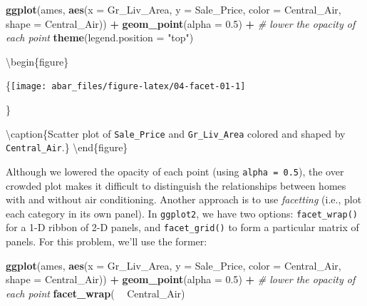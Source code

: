 \documentclass[]{book}
\newenvironment{Shaded}{\begin{snugshade}}{\end{snugshade}}
\newcommand{\CommentTok}[1]{\textcolor[rgb]{0.56,0.35,0.01}{\textit{#1}}}
\newcommand{\DataTypeTok}[1]{\textcolor[rgb]{0.13,0.29,0.53}{#1}}
\newcommand{\FloatTok}[1]{\textcolor[rgb]{0.00,0.00,0.81}{#1}}
\newcommand{\KeywordTok}[1]{\textcolor[rgb]{0.13,0.29,0.53}{\textbf{#1}}}
\newcommand{\NormalTok}[1]{#1}
\newcommand{\OperatorTok}[1]{\textcolor[rgb]{0.81,0.36,0.00}{\textbf{#1}}}
\newcommand{\StringTok}[1]{\textcolor[rgb]{0.31,0.60,0.02}{#1}}
\theoremstyle{definition}
\theoremstyle{definition}
\theoremstyle{definition}
\theoremstyle{remark}
\begin{document}
\begin{Shaded}
\begin{Highlighting}[]
\KeywordTok{ggplot}\NormalTok{(ames, }\KeywordTok{aes}\NormalTok{(}\DataTypeTok{x =}\NormalTok{ Gr_Liv_Area, }\DataTypeTok{y =}\NormalTok{ Sale_Price, }
                 \DataTypeTok{color =}\NormalTok{ Central_Air, }\DataTypeTok{shape =}\NormalTok{ Central_Air)) }\OperatorTok{+}
\StringTok{  }\KeywordTok{geom_point}\NormalTok{(}\DataTypeTok{alpha =} \FloatTok{0.5}\NormalTok{) }\OperatorTok{+}\StringTok{  }\CommentTok{# lower the opacity of each point}
\StringTok{  }\KeywordTok{theme}\NormalTok{(}\DataTypeTok{legend.position =} \StringTok{"top"}\NormalTok{)}
\end{Highlighting}
\end{Shaded}

\textbackslash{}begin\{figure\}

\{\centering \texttt{[image: abar\_files/figure-latex/04-facet-01-1]}

\}

\textbackslash{}caption\{Scatter plot of \texttt{Sale\_Price} and
\texttt{Gr\_Liv\_Area} colored and shaped by
\texttt{Central\_Air}.\}\label{fig:04-facet-01}
\textbackslash{}end\{figure\}

Although we lowered the opacity of each point (using
\texttt{alpha\ =\ 0.5}), the over crowded plot makes it difficult to
distinguish the relationships between homes with and without air
conditioning. Another approach is to use \emph{facetting} (i.e., plot
each category in its own panel). In \texttt{ggplot2}, we have two
options: \texttt{facet\_wrap()} for a 1-D ribbon of 2-D panels, and
\texttt{facet\_grid()} to form a particular matrix of panels. For this
problem, we'll use the former:

\begin{Shaded}
\begin{Highlighting}[]
\KeywordTok{ggplot}\NormalTok{(ames, }\KeywordTok{aes}\NormalTok{(}\DataTypeTok{x =}\NormalTok{ Gr_Liv_Area, }\DataTypeTok{y =}\NormalTok{ Sale_Price, }
                 \DataTypeTok{color =}\NormalTok{ Central_Air, }\DataTypeTok{shape =}\NormalTok{ Central_Air)) }\OperatorTok{+}
\StringTok{  }\KeywordTok{geom_point}\NormalTok{(}\DataTypeTok{alpha =} \FloatTok{0.5}\NormalTok{) }\OperatorTok{+}\StringTok{  }\CommentTok{# lower the opacity of each point}
\StringTok{  }\KeywordTok{facet_wrap}\NormalTok{( }\OperatorTok{~}\StringTok{ }\NormalTok{Central_Air)}
\end{Highlighting}
\end{Shaded}
\end{document}
